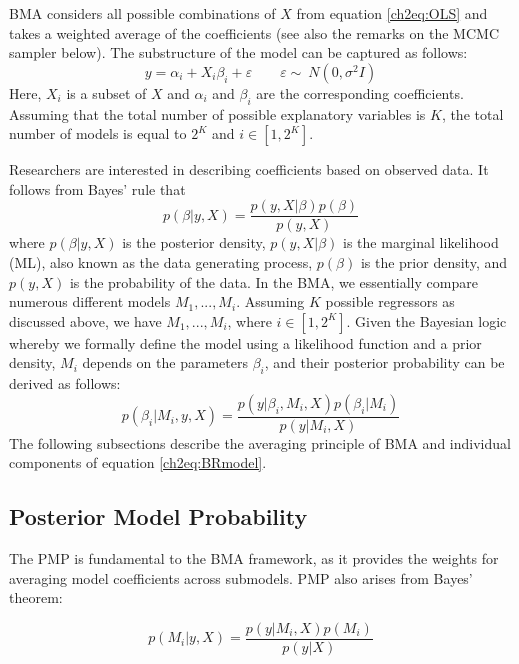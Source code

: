 \ac{BMA} considers all possible combinations of $X$ from equation \ref{ch2eq:OLS} and takes a weighted average of the coefficients (see also the remarks on the \ac{MCMC} sampler below). The substructure of the model can be captured as follows:
%
\begin{equation}\label{ch2eq:OLSsub}
	y = \alpha_{i} + X_{i}\beta_{i}+ \varepsilon \qquad \varepsilon  \sim\ N(0, \sigma^{2}I)
\end{equation}
%
Here, $X_{i}$ is a subset of $X$ and $\alpha_{i} $ and $ \beta_{i}$ are the corresponding coefficients. Assuming that the total number of possible explanatory variables is $K$, the total number of models is equal to $2^{K}$ and $i \in [1,2^{K}]$. 

Researchers are interested in describing coefficients based on observed data. It follows from Bayes' rule that
%
\begin{equation}\label{ch2eq:BRmodel}
	p(\beta \vert y,X) = \frac{p(y,X\vert \beta)p(\beta)}{p(y,X)}
\end{equation}
where $p(\beta \vert y, X)$ is the posterior density, $p(y, X\vert \beta)$ is the marginal likelihood (ML), also known as the data generating process, $p(\beta)$ is the prior density, and $p(y,X)$ is the probability of the data. In the \ac{BMA}, we essentially compare numerous different models $M_{1},...,M_{i}$.  Assuming $K$ possible regressors as discussed above, we have $M_{1},...,M_{i}$, where $i \in [1,2^{K}]$. Given the Bayesian logic whereby we formally define the model using a likelihood function and a prior density, $M_{i}$ depends on the parameters $\beta_{i}$, and their posterior probability can be derived as follows:
\begin{equation}\label{ch2eq:BROM}
	p(\beta_{i} \vert M_{i},y,X) = \frac{p(y\vert \beta_{i},M_{i},X)p(\beta_{i}\vert M_{i})}{p(y \vert M_{i},X)}
\end{equation}
The following subsections describe the averaging principle of \ac{BMA} and individual components of equation \ref{ch2eq:BRmodel}.
%
\subsection{Posterior Model Probability}
%
The \ac{PMP} is fundamental to the \ac{BMA} framework, as it provides the weights for averaging model coefficients across submodels. \ac{PMP} also arises from Bayes' theorem:

\begin{equation}\label{ch2eq:PMPmain}
	p(M_{i} \vert y,X) = \frac{p(y\vert M_{i},X)p(M_{i})}{p(y \vert X)}
\end{equation}

